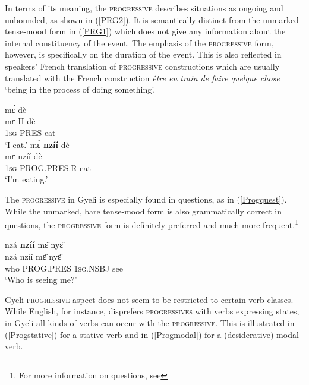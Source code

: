 In terms of its meaning, the \textsc{progressive} describes situations as ongoing and unbounded, as shown in (\ref{PRG2}). It is semantically distinct from the unmarked tense-mood form in (\ref{PRG1}) which does not give any information about the internal constituency of the event. The emphasis of the \textsc{progressive} form, however, is specifically on the duration of the event. This is also reflected in speakers' French translation of \textsc{progressive} constructions which are usually translated with the French construction {\itshape être en train de faire quelque chose} `being in the process of doing something'.

\begin{exe} 
\ex\label{PRG}
\begin{xlist}
\ex\label{PRG1}
  \glll     mɛ́ dè \\
           mɛ-H dè \\
              1\textsc{sg}-PRES eat  \\
    \trans `I eat.'
\ex\label{PRG2}
  \glll   mɛ̀ {\bfseries nzíí} dè  \\
          mɛ nzíí dè  \\
              1\textsc{sg} PROG.PRES.R eat   \\
    \trans `I'm eating.'
\end{xlist}
\end{exe}


The \textsc{progressive} in Gyeli  is especially found in questions, as in (\ref{Progquest}). While the unmarked, bare tense-mood form is also grammatically correct in questions, the \textsc{progressive} form is definitely preferred and much more frequent.\footnote{For more information on questions, see }

\begin{exe} 
\ex\label{Progquest}
  \glll nzá {\bfseries nzíí} mɛ̂ nyɛ̂ \\
    nzá nzíí mɛ̂ nyɛ̂ \\
         who PROG.PRES 1\textsc{sg}.NSBJ see\\
    \trans `Who is seeing me?'
\end{exe}

Gyeli \textsc{progressive} aspect does not seem to be restricted to certain verb classes. While English, for instance, disprefers \textsc{progressives} with verbs expressing states, in Gyeli all kinds of verbs can occur with the \textsc{progressive}. This is illustrated in (\ref{Progstative}) for a stative verb and in (\ref{Progmodal}) for a (desiderative) modal verb.

